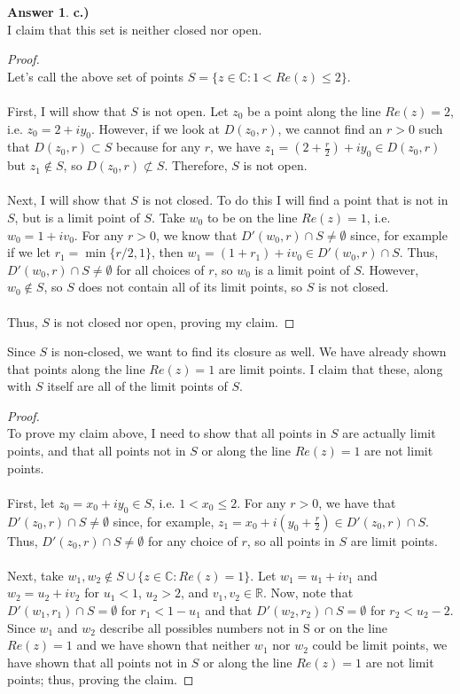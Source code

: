 \documentclass[10pt,a4paper]{article}
\theoremstyle{definition}
\newtheorem*{answer*}{Answer}
\begin{document}
\begin{answer*}{\textbf{c.)}}
\\I claim that this set is neither closed nor open.
\begin{proof}{$ $}
\\Let's call the above set of points $S = \{z \in \mathbb{C} : 1 < Re(z) \leq 2\}$.
\\
\\First, I will show that $S$ is not open. Let $z_0$ be a point along the line $Re(z) = 2$, i.e. $z_0 = 2 + iy_0$. However, if we look at $D(z_0, r)$, we cannot find an $r>0$ such that $D(z_0, r) \subset S$ because for any $r$, we have $z_1 = (2 + \frac{r}{2}) + iy_0 \in D(z_0, r)$ but $z_1 \notin S$, so $D(z_0, r) \not\subset S$. Therefore, $S$ is not open. 
\\
\\Next, I will show that $S$ is not closed. To do this I will find a point that is not in $S$, but is a limit point of $S$. Take $w_0$ to be on the line $Re(z) = 1$, i.e. $w_0 = 1 + iv_0$. For any $r > 0$, we know that $D'(w_0,r) \cap S \neq \emptyset$ since, for example if we let $r_1 = \min\{r/2, 1\}$, then $w_1 = (1 + r_1) + iv_0 \in D'(w_0,r) \cap S$. Thus, $D'(w_0,r) \cap S \neq \emptyset$ for all choices of $r$, so $w_0$ is a limit point of $S$. However, $w_0 \notin S$, so $S$ does not contain all of its limit points, so $S$ is not closed.
\\
\\Thus, $S$ is not closed nor open, proving my claim.
\end{proof}

Since $S$ is non-closed, we want to find its closure as well. We have already shown that points along the line $Re(z) = 1$ are limit points. I claim that these, along with $S$ itself are all of the limit points of $S$.

\begin{proof}{$ $}
\\To prove my claim above, I  need to show that all points in $S$ are actually limit points, and that all points not in $S$ or along the line $Re(z) = 1$ are not limit points.\\
\\First, let $z_0 = x_0 + iy_0 \in S$, i.e. $1 < x_0 \leq 2$. For any $r>0$, we have that $D'(z_0, r) \cap S \neq \emptyset$ since, for example, $z_1 = x_0 + i(y_0 + \frac{r}{2}) \in D'(z_0, r) \cap S$. Thus, $D'(z_0, r) \cap S \neq \emptyset$ for any choice of $r$, so all points in $S$ are limit points. 
\\
\\Next, take $w_1, w_2 \notin S \cup \{z \in \mathbb{C} : Re(z) = 1\}$. Let $w_1 = u_1 + iv_1$ and $w_2 = u_2 + iv_2$ for $u_1 < 1$, $u_2 > 2$, and $v_1, v_2 \in \mathbb{R}$. Now, note that $D'(w_1, r_1) \cap S = \emptyset$ for $r_1 < 1 - u_1$ and that $D'(w_2, r_2) \cap S = \emptyset$ for $r_2 < u_2 - 2$. Since $w_1$ and $w_2$ describe all possibles numbers not in S or on the line $Re(z) = 1$ and we have shown that neither $w_1$ nor $w_2$ could be limit points, we have shown that all points not in $S$ or along the line $Re(z) = 1$ are not limit points; thus, proving the claim. 
\end{proof}


\end{answer*}
\end{document}
